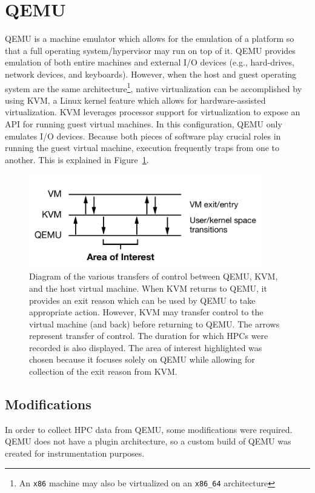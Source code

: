 \documentclass[notitlepage]{article}
\begin{document}
\section{QEMU}
QEMU is a machine emulator which allows for the emulation of a platform so that
a full operating system/hypervisor may run on top of it. QEMU provides emulation
of both entire machines and external I/O devices (e.g., hard-drives, network
devices, and keyboards). However, when the host and guest operating system are
the same architecture\footnote{An \texttt{x86} machine may also be virtualized
on an \texttt{x86\_64} architecture}, native virtualization can be accomplished
by using KVM, a Linux kernel feature which allows for hardware-assisted
virtualization. KVM leverages processor support for virtualization to expose an
API for running guest virtual machines. In this configuration, QEMU only
emulates I/O devices.  Because both pieces of software play crucial roles in
running the guest virtual machine, execution frequently traps from one to
another. This is explained in Figure~\ref{fig:qemutrap}.

\begin{figure}
    \centering    
    \includegraphics[width=4in]{qemu_trap.pdf}
    \caption{Diagram of the various transfers of control between QEMU, KVM, and
        the host virtual machine. When KVM returns to QEMU, it provides an exit
        reason which can be used by QEMU to take appropriate action. However,
        KVM may transfer control to the virtual machine (and back) before
        returning to QEMU. The arrows represent transfer of control. The
        duration for which HPCs were recorded is also displayed. The area of
        interest highlighted was chosen because it focuses solely on QEMU while
        allowing for collection of the exit reason from KVM.}
\label{fig:qemutrap}
\end{figure}

\subsection{Modifications}
In order to collect HPC data from QEMU, some modifications were required. QEMU
does not have a plugin architecture, so a custom build of QEMU was created for
instrumentation purposes.
\end{document}
